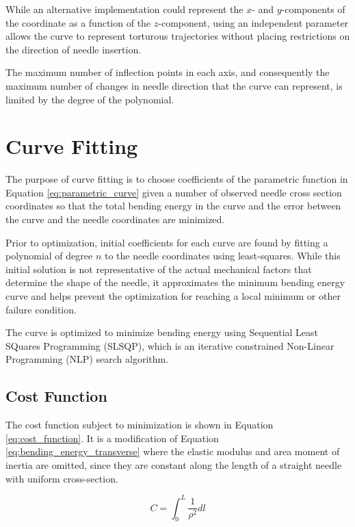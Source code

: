 While an alternative implementation could represent the $x$- and $y$-components of the coordinate as a function of the $z$-component, using an independent parameter allows the curve to represent torturous trajectories without placing restrictions on the direction of needle insertion.

The maximum number of inflection points in each axis, and consequently the maximum number of changes in needle direction that the curve can represent, is limited by the degree of the polynomial.

\section{Curve Fitting}
The purpose of curve fitting is to choose coefficients of the parametric function in Equation \ref{eq:parametric_curve} given a number of observed needle cross section coordinates so that the total bending energy in the curve and the error between the curve and the needle coordinates are minimized.

Prior to optimization, initial coefficients for each curve are found by fitting a polynomial of degree $n$ to the needle coordinates using least-squares. While this initial solution is not representative of the actual mechanical factors that determine the shape of the needle, it approximates the minimum bending energy curve and helps prevent the optimization for reaching a local minimum or other failure condition.

The curve is optimized to minimize bending energy using Sequential Least SQuares Programming (SLSQP), which is an iterative constrained Non-Linear Programming (NLP) search algorithm\cite{kraft_software_1988}.

\subsection{Cost Function}
The cost function subject to minimization is shown in Equation \ref{eq:cost_function}. It is a modification of Equation \ref{eq:bending_energy_transverse} where the elastic modulus and area moment of inertia are omitted, since they are constant along the length of a straight needle with uniform cross-section.

\begin{equation}
\label{eq:cost_function}
C = \int_{0}^{L} \frac{1}{\rho^2}dl
\end{equation}

